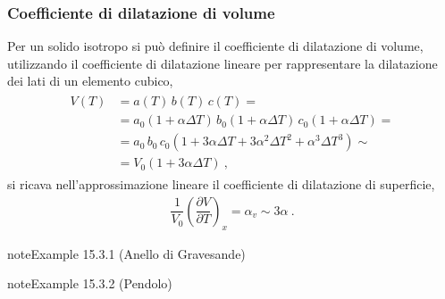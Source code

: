 \documentclass[letterpaper,10pt,italian]{jupyterBook}
\begin{document}
\subsubsection{Coefficiente di dilatazione di volume}
\label{\detokenize{ch/thermodynamics/elastic-solid-1d:coefficiente-di-dilatazione-di-volume}}
\sphinxAtStartPar
Per un solido isotropo si può definire il coefficiente di dilatazione di volume, utilizzando il coefficiente di dilatazione lineare per rappresentare la dilatazione dei lati di un elemento cubico,
\begin{equation*}
\begin{split}\begin{aligned}
  V(T)
  & = a(T) \, b(T) \, c(T) = \\
  & = a_0 (1 + \alpha \Delta T) \, b_0 (1 + \alpha \Delta T) \, c_0 (1+\alpha \Delta T) = \\ 
  & = a_0 \, b_0 \, c_0 (1 + 3 \alpha \Delta T + 3 \alpha^2 \Delta T^2 +  \alpha^3 \Delta T^3) \sim \\
  & = V_0 ( 1 + 3 \alpha \Delta T ) \ , 
\end{aligned}\end{split}
\end{equation*}
\sphinxAtStartPar
si ricava nell’approssimazione lineare il coefficiente di dilatazione di superficie,
\begin{equation*}
\begin{split} \dfrac{1}{V_0}\left(\dfrac{\partial V}{\partial T}\right)_x = \alpha_v \sim 3 \alpha \ .\end{split}
\end{equation*}\label{ch/thermodynamics/elastic-solid-1d:thermodynamics:elastic-solid:gravesande}
\begin{sphinxadmonition}{note}{Example 15.3.1 (Anello di Gravesande)}



\sphinxAtStartPar
{\hyperref[\detokenize{ch/thermodynamics/foundation-experiments:thermodynamics:history:th-expansion:gravesande}]{}}
\end{sphinxadmonition}
\label{ch/thermodynamics/elastic-solid-1d:thermodynamics:elastic-solid:pendulum}
\begin{sphinxadmonition}{note}{Example 15.3.2 (Pendolo)}


\end{sphinxadmonition}
\label{ch/thermodynamics/elastic-solid-1d:thermodynamics:elastic-solid:interference}
\end{document}
